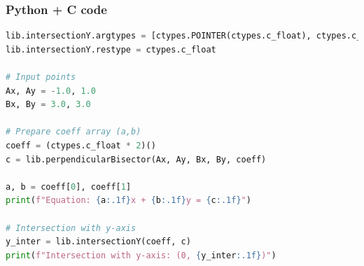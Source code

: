 \documentclass{beamer}
\begin{document}
\begin{frame}[fragile]
    \frametitle{Python + C code}

    \begin{lstlisting}[language=Python]
lib.intersectionY.argtypes = [ctypes.POINTER(ctypes.c_float), ctypes.c_float]
lib.intersectionY.restype = ctypes.c_float

# Input points
Ax, Ay = -1.0, 1.0
Bx, By = 3.0, 3.0

# Prepare coeff array (a,b)
coeff = (ctypes.c_float * 2)()
c = lib.perpendicularBisector(Ax, Ay, Bx, By, coeff)

a, b = coeff[0], coeff[1]
print(f"Equation: {a:.1f}x + {b:.1f}y = {c:.1f}")

# Intersection with y-axis
y_inter = lib.intersectionY(coeff, c)
print(f"Intersection with y-axis: (0, {y_inter:.1f})")
    \end{lstlisting}
\end{frame}
\end{document}

